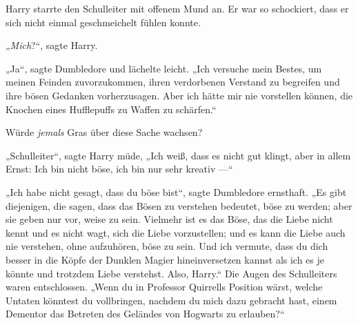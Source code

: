 Harry starrte den Schulleiter mit offenem Mund an. Er war so schockiert, dass er sich nicht einmal geschmeichelt fühlen konnte.

„\emph{Mich}?“, sagte Harry.

„Ja“, sagte Dumbledore und lächelte leicht.
„Ich versuche mein Bestes, um meinen Feinden zuvorzukommen, ihren verdorbenen Verstand zu begreifen und ihre bösen Gedanken vorherzusagen. Aber ich hätte mir nie vorstellen können, die Knochen eines Hufflepuffs zu Waffen zu schärfen.“

Würde \emph{jemals} Gras über diese Sache wachsen?

„Schulleiter“, sagte Harry müde,
„Ich weiß, dass es nicht gut klingt, aber in allem Ernst: Ich bin nicht böse, ich bin nur sehr kreativ —“

„Ich habe nicht gesagt, dass du böse bist“, sagte Dumbledore ernsthaft.
„Es gibt diejenigen, die sagen, dass das Bösen zu verstehen bedeutet, böse zu werden; aber sie geben nur vor, weise zu sein. Vielmehr ist es das Böse, das die Liebe nicht kennt und es nicht wagt, sich die Liebe vorzustellen; und es kann die Liebe auch nie verstehen, ohne aufzuhören, böse zu sein. Und ich vermute, dass du dich besser in die Köpfe der Dunklen Magier hineinversetzen kannst als ich es je könnte und trotzdem Liebe verstehst. Also, Harry.“ Die Augen des Schulleiters waren entschlossen.
„Wenn du in Professor Quirrells Position wärst, welche Untaten könntest du vollbringen, nachdem du mich dazu gebracht hast, einem Dementor das Betreten des Geländes von Hogwarts zu erlauben?“

